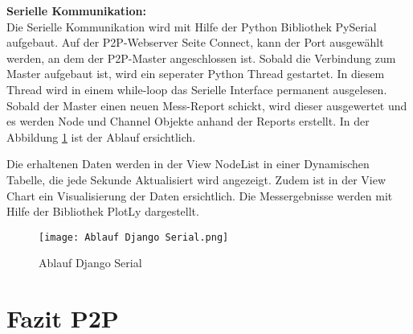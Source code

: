 \textbf{Serielle Kommunikation: } \\
Die Serielle Kommunikation wird mit Hilfe der Python Bibliothek PySerial aufgebaut. Auf der P2P-Webserver Seite Connect, kann der Port ausgewählt werden, an dem der P2P-Master angeschlossen ist. Sobald die Verbindung zum Master aufgebaut ist, wird ein seperater Python Thread gestartet. In diesem Thread wird in einem while-loop das Serielle Interface permanent ausgelesen. Sobald der Master einen neuen Mess-Report schickt, wird dieser ausgewertet und es werden Node und Channel Objekte anhand der Reports erstellt. In der Abbildung \ref{fig:AblaufDjangoSerial} ist der Ablauf ersichtlich.

Die erhaltenen Daten werden in der View Node\textunderscore List in einer Dynamischen Tabelle, die jede Sekunde Aktualisiert wird angezeigt. Zudem ist in der View Chart ein Visualisierung der Daten ersichtlich. Die Messergebnisse werden mit Hilfe der Bibliothek PlotLy dargestellt. \\

\begin{figure} [H]
	\centering
	\texttt{[image: Ablauf Django Serial.png]}
	\caption{Ablauf Django Serial}
	\label{fig:AblaufDjangoSerial}
\end{figure}


\section{Fazit P2P}\label{sec:FazitP2P}

